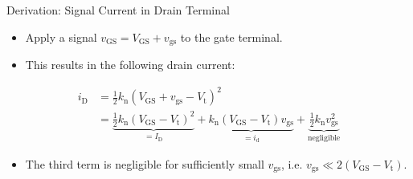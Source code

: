 \begin{frame}{Derivation: Signal Current in Drain Terminal}
    \begin{itemize}
        \item Apply a signal $v_{\mathrm{GS}}=V_{\mathrm{GS}}+v_{\mathrm{gs}}$ to the gate terminal.
        \item This results in the following drain current:
    \end{itemize}
    \begin{align*}
        i_{\mathrm{D}}&=\frac{1}{2}k_{\mathrm{n}}(V_{\mathrm{GS}}+v_{\mathrm{gs}}
        -V_{\mathrm{t}})^{2} \\
        &=\underbrace{ \frac{1}{2}k_{\mathrm{n}}(V_{\mathrm{GS}}-V_{\mathrm{t}})^{2} }_{ =I_{\mathrm{D}}}
        +\underbrace{k_{\mathrm{n}}(V_{\mathrm{GS}}-V_{\mathrm{t}})v_{\mathrm{gs}}}_{=i_{\mathrm{d}}}
        +\underbrace{\frac{1}{2}k_{\mathrm{n}}v_{\mathrm{gs}}^{2}}_{ \text{negligible} }
    \end{align*}
    \begin{itemize}
        \item The third term is negligible for sufficiently small $v_{\mathrm{gs}}$, i.e. 
        $v_{\mathrm{gs}}\ll 2(V_{\mathrm{GS}}-V_{\mathrm{t}})$.
    \end{itemize}
\end{frame}

